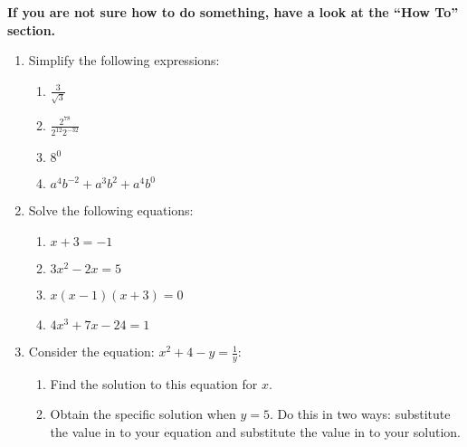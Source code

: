 \textbf{If you are not sure how to do something, have a look at the “How To” section.}
\begin{enumerate}

\item 

Simplify the following expressions:
\begin{enumerate}

\item 

\(\frac{3}{\sqrt{3}}\)

\item 

\(\frac{2 ^ {78}}{2 ^ {12}2^{-32}}\)

\item 

\(8^0\)

\item 

\(a^4b^{-2}+a^{3}b^{2}+a^{4}b^0\)

\end{enumerate}

\item 

Solve the following equations:
\begin{enumerate}

\item 

\(x + 3 = -1\)

\item 

\(3 x ^ 2 - 2 x = 5\)

\item 

\(x (x - 1) (x + 3) = 0\)

\item 

\(4 x ^3 + 7x - 24 = 1\)

\end{enumerate}

\item 

Consider the equation: \(x ^ 2 + 4 - y = \frac{1}{y}\):
\begin{enumerate}

\item 

Find the solution to this equation for \(x\).

\item 

Obtain the specific solution when \(y = 5\). Do this in two ways:
substitute the value in to your equation and substitute the value in to
your solution.


\end{enumerate}
\end{enumerate}
